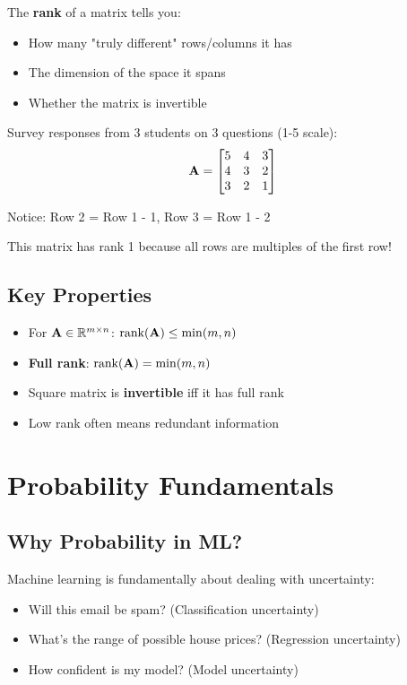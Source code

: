 \documentclass{article}
\newcounter{example}
\begin{document}
The \textbf{rank} of a matrix tells you:
\begin{itemize}
    \item How many "truly different" rows/columns it has
    \item The dimension of the space it spans
    \item Whether the matrix is invertible
\end{itemize}

\begin{tcolorbox}[colback=yellow!5!white,colframe=yellow!75!black,title=Example \stepcounter{example}\#\theexample: Student Survey Matrix]
Survey responses from 3 students on 3 questions (1-5 scale):
$$\mathbf{A} = \begin{bmatrix} 
5 & 4 & 3 \\
4 & 3 & 2 \\
3 & 2 & 1
\end{bmatrix}$$

Notice: Row 2 = Row 1 - 1, Row 3 = Row 1 - 2

This matrix has rank 1 because all rows are multiples of the first row!
\end{tcolorbox}

\subsection{Key Properties}
\begin{itemize}
    \item For $\mathbf{A} \in \mathbb{R}^{m \times n}$: $\text{rank}(\mathbf{A}) \leq \min(m,n)$
    \item \textbf{Full rank}: $\text{rank}(\mathbf{A}) = \min(m,n)$
    \item Square matrix is \textbf{invertible} iff it has full rank
    \item Low rank often means redundant information
\end{itemize}

\section{Probability Fundamentals}

\subsection{Why Probability in ML?}

Machine learning is fundamentally about dealing with uncertainty:
\begin{itemize}
    \item Will this email be spam? (Classification uncertainty)
    \item What's the range of possible house prices? (Regression uncertainty)  
    \item How confident is my model? (Model uncertainty)
\end{itemize}
\end{document}
